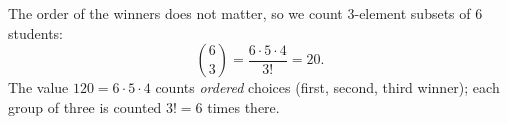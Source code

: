 The order of the winners does not matter, so we count $3$-element subsets of $6$ students:
\[
\binom63=\dfrac{6\cdot5\cdot4}{3!}=\boxed{20}.
\]
The value $120=6\cdot5\cdot4$ counts \emph{ordered} choices (first, second, third winner); each group of three is counted $3!=6$ times there.
